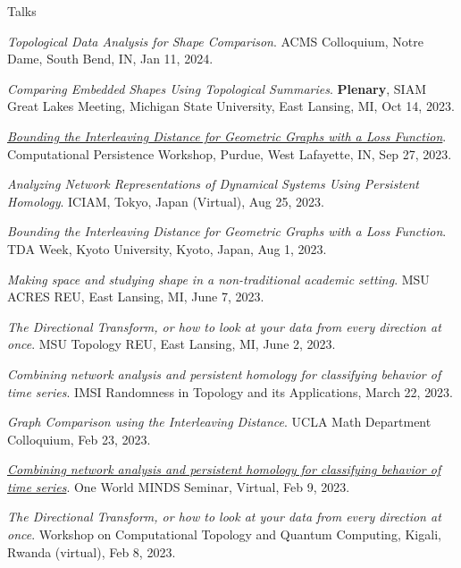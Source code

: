 \documentclass{resume} %
\begin{document}
\begin{rSection}{Talks}
\begin{etaremune}
\item\emph{Topological Data Analysis for Shape Comparison}. ACMS Colloquium, Notre Dame, South Bend, IN, Jan 11, 2024. 

\item\emph{Comparing Embedded Shapes Using Topological Summaries}. \textbf{Plenary}, SIAM Great Lakes Meeting, Michigan State University, East Lansing, MI, Oct 14, 2023. 

\item\emph{\href{https://youtu.be/PJBgBoowQA4}{Bounding the Interleaving Distance for Geometric Graphs with a Loss Function}}. Computational Persistence Workshop, Purdue, West Lafayette, IN, Sep 27, 2023. 

\item\emph{Analyzing Network Representations of Dynamical Systems Using Persistent Homology}. ICIAM, Tokyo, Japan (Virtual), Aug 25, 2023. 

\item\emph{Bounding the Interleaving Distance for Geometric Graphs with a Loss Function}. TDA Week, Kyoto University, Kyoto, Japan, Aug 1, 2023. 

\item\emph{Making space and studying shape in a non-traditional academic setting}. MSU ACRES REU, East Lansing, MI, June 7, 2023. 

\item\emph{The Directional Transform, or how to look at your data from every direction at once}. MSU Topology REU, East Lansing, MI, June 2, 2023. 

\item\emph{Combining network analysis and persistent homology for classifying behavior of time series}. IMSI Randomness in Topology and its Applications, March 22, 2023. 

\item\emph{Graph Comparison using the Interleaving Distance}. UCLA Math Department Colloquium, Feb 23, 2023. 

\item\emph{\href{https://youtu.be/EYOTp1I0mwY}{Combining network analysis and persistent homology for classifying behavior of time series}}. One World MINDS Seminar, Virtual, Feb 9, 2023. 

\item\emph{The Directional Transform, or how to look at your data from every direction at once}. Workshop on Computational Topology and Quantum Computing, Kigali, Rwanda (virtual), Feb 8, 2023. 


\end{etaremune}
\end{rSection}
\end{document}
